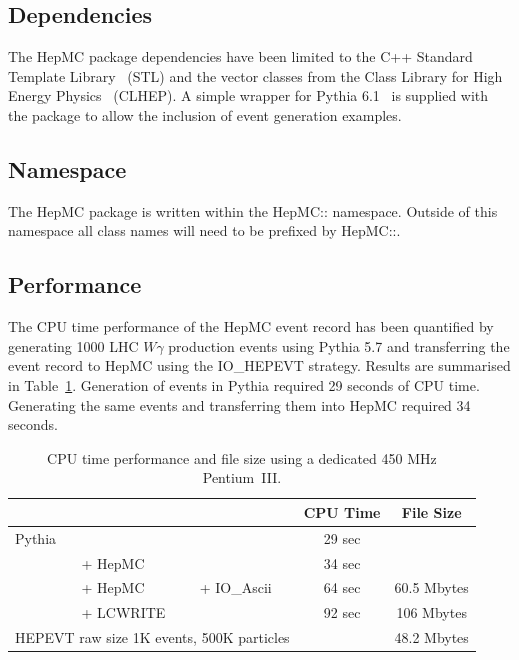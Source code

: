 \documentclass[11pt,letterpaper]{article}
\begin{document}
\subsection{Dependencies}

The HepMC package dependencies have been limited to the C++ Standard
Template Library~\cite{stl} (STL) and the vector classes from the
Class Library for High Energy Physics~\cite{clhep} (CLHEP).  A simple
wrapper for Pythia 6.1~\cite{Sjostrand:1994yb} is supplied with the
package to allow the inclusion of event generation examples.

\subsection{Namespace}

The HepMC package is written within the HepMC:: namespace. Outside of
this namespace all class names will need to be prefixed by HepMC::.


\subsection{Performance}

The CPU time performance of the HepMC event record has been quantified
by generating 1000 LHC $W\gamma$ production events using Pythia 5.7
and transferring the event record to HepMC using the IO\_HEPEVT
strategy. Results are summarised in Table~\ref{benchmarks}.
Generation of events in Pythia required 29 seconds of CPU time.
Generating the same events and transferring them into HepMC required
34 seconds.

\begin{table}[h]
\begin{center}
\begin{tabular}{|l l l|c|c|} \hline
&&&CPU Time & File Size \\ \hline
Pythia &           &          & 29 sec & \\
       & + {\color{red}HepMC}   &          & 34 sec & \\ \hline
       & + {\color{red}HepMC} & + {\color{red}IO\_Ascii} 
       & 64 sec & 60.5 Mbytes \\
       & + {\color{green}LCWRITE} &          
       & 92 sec & 106 Mbytes \\
\multicolumn{3}{|l|}{HEPEVT raw size 1K events, 500K particles}
&& 48.2 Mbytes \\ \hline
\end{tabular}
\end{center}
\caption{\label{benchmarks} 
  CPU time performance and file size using a dedicated 450 MHz Pentium~III.}
\end{table}
\end{document}
